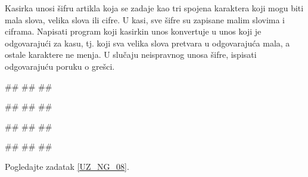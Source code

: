 \begin{Exercise}[label=KT_NG_11] 
Kasirka unosi šifru artikla koja se zadaje kao tri spojena karaktera koji mogu biti mala slova, velika slova ili cifre. 
U kasi, sve šifre su zapisane malim slovima i ciframa. Napisati program koji kasirkin unos konvertuje u unos
koji je odgovarajući za kasu, tj. koji sva velika slova pretvara u odgovarajuća mala, a ostale karaktere ne menja. 
U slučaju neispravnog unosa šifre, ispisati odgovarajuću poruku o grešci.

\begin{miditest}
\begin{upotreba}{1}
#\naslovInt#
##
##
\end{upotreba}
\end{miditest}
\begin{miditest}
\begin{upotreba}{2}
#\naslovInt#
##
##
\end{upotreba}
\end{miditest}

\begin{miditest}
\begin{upotreba}{3}
#\naslovInt#
##
##
\end{upotreba}
\end{miditest}
\begin{miditest}
\begin{upotreba}{4}
#\naslovInt#
##
##
\end{upotreba}
\end{miditest}
\end{Exercise}
\ifresenja
 \begin{Answer}[ref=KT_NG_11]

Pogledajte zadatak \ref{UZ_NG_08}.
\end{Answer}
\fi




